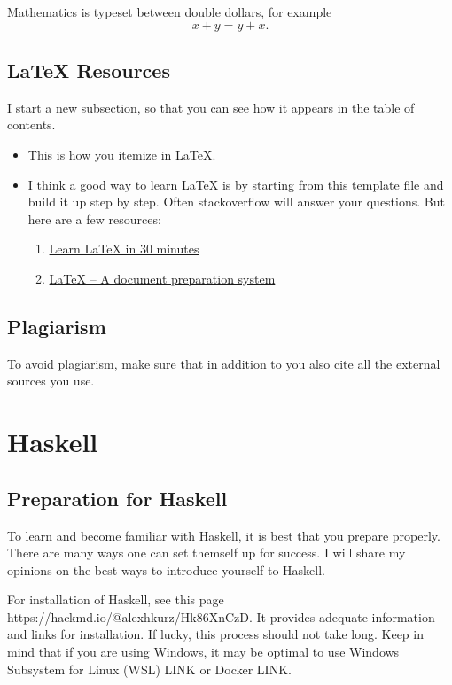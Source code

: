 \documentclass{article}
\begin{document}
\medskip\noindent
Mathematics is typeset between double dollars, for example $$x+y=y+x.$$


\subsection{LaTeX Resources}

I start a new subsection, so that you can see how it appears in the table of contents.

\begin{itemize}
\item This is how you itemize in LaTeX.
\item I think a good way to learn LaTeX is by starting from this template file and build it up step by step. Often stackoverflow will answer your questions. But here are a few resources:
  \begin{enumerate}
  \item \href{https://www.overleaf.com/learn/latex/Learn_LaTeX_in_30_minutes}{Learn LaTeX in 30 minutes}
  \item \href{https://www.latex-project.org/}{LaTeX – A document preparation system}\end{enumerate}
\end{itemize}

\subsection{Plagiarism}

To avoid plagiarism, make sure that in addition to \cite{PL} you also cite all the external sources you use.

\section{Haskell}\label{haskell}

\subsection{Preparation for Haskell}
\medskip\noindent
To learn and become familiar with Haskell, it is best that you prepare properly. There are many ways one can set themself up for success. I will share my opinions on the best ways to introduce yourself to Haskell.

\medskip\noindent
For installation of Haskell, see this page https://hackmd.io/@alexhkurz/Hk86XnCzD. It provides adequate information and links for installation. If lucky, this process should not take long. Keep in mind that if you are using Windows, it may be optimal to use Windows Subsystem for Linux (WSL) LINK or Docker LINK.
\end{document}
